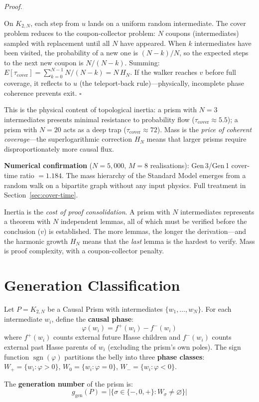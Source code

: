 \documentclass[11pt, a4paper, openany]{book}
\newcounter{thm}[chapter]
\renewenvironment{proof}[1][Proof]{%
  \par\noindent\textit{#1.}\quad
}{\hfill$\square$\par\medskip}
\begin{document}
\begin{proof}
On $K_{2,N}$, each step from $u$ lands on a uniform random intermediate.  The cover problem reduces to the coupon-collector problem: $N$ coupons (intermediates) sampled with replacement until all $N$ have appeared.  When $k$ intermediates have been visited, the probability of a new one is $(N-k)/N$, so the expected steps to the next new coupon is $N/(N-k)$.  Summing: $E[\tau_{\mathrm{cover}}] = \sum_{k=0}^{N-1} N/(N-k) = N\,H_N$.  If the walker reaches $v$ before full coverage, it reflects to $u$ (the teleport-back rule)---physically, incomplete phase coherence prevents exit.
\end{proof}

\noindent
This is the physical content of topological inertia: a prism with $N = 3$ intermediates presents minimal resistance to probability flow ($\tau_{\mathrm{cover}} \approx 5.5$); a prism with $N = 20$ acts as a deep trap ($\tau_{\mathrm{cover}} \approx 72$).  Mass is the \emph{price of coherent coverage}---the superlogarithmic correction $H_N$ means that larger prisms require disproportionately more causal flux.

\textbf{Numerical confirmation} ($N = 5{,}000$, $M = 8$ realisations): Gen\,3/Gen\,1 cover-time ratio $= 1.184$.  The mass hierarchy of the Standard Model emerges from a random walk on a bipartite graph without any input physics.  Full treatment in Section~\ref{sec:cover-time}.

\begin{logicalreading}
Inertia is the \emph{cost of proof consolidation}. A prism with $N$ intermediates represents a theorem with $N$ independent lemmas, all of which must be verified before the conclusion ($v$) is established. The more lemmas, the longer the derivation---and the harmonic growth $H_N$ means that the \emph{last} lemma is the hardest to verify. Mass is proof complexity, with a coupon-collector penalty.
\end{logicalreading}

\section{Generation Classification}\label{sec:generations}

\begin{definition}\label{def:generation}
Let $P = K_{2,N}$ be a Causal Prism with intermediates $\{w_1, \ldots, w_N\}$. For each intermediate $w_i$, define the \textbf{causal phase}:
\[
  \varphi(w_i) = f^+(w_i) - f^-(w_i)
\]
where $f^+(w_i)$ counts external future Hasse children and $f^-(w_i)$ counts external past Hasse parents of $w_i$ (excluding the prism's own poles). The sign function $\operatorname{sgn}(\varphi)$ partitions the belly into three \textbf{phase classes}: $W_+ = \{w_i : \varphi > 0\}$, $W_0 = \{w_i : \varphi = 0\}$, $W_- = \{w_i : \varphi < 0\}$.

The \textbf{generation number} of the prism is:
\[
  g_{\mathrm{gen}}(P) = |\{\sigma \in \{-, 0, +\} : W_\sigma \neq \varnothing\}|
\]
\end{definition}
\end{document}
